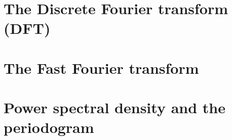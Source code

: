 \section{The Discrete Fourier transform (DFT)}


\section{The Fast Fourier transform}
\TBC 

\section{Power spectral density and the periodogram}

\TBC